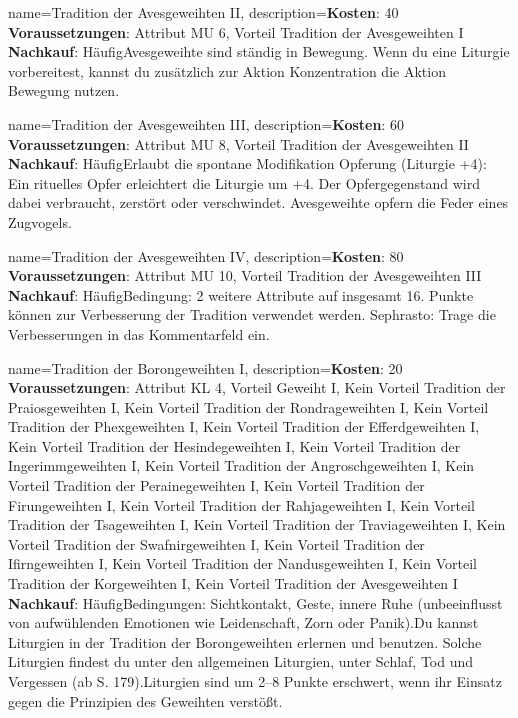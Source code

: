 {
    name={Tradition der Avesgeweihten II},
    description={\textbf{Kosten}: 40 \textbf{Voraussetzungen}: Attribut MU 6, Vorteil Tradition der Avesgeweihten I \textbf{Nachkauf}: Häufig\newline Avesgeweihte sind ständig in Bewegung. Wenn du eine Liturgie vorbereitest, kannst du zusätzlich zur Aktion Konzentration die Aktion Bewegung nutzen.}
}


{
    name={Tradition der Avesgeweihten III},
    description={\textbf{Kosten}: 60 \textbf{Voraussetzungen}: Attribut MU 8, Vorteil Tradition der Avesgeweihten II \textbf{Nachkauf}: Häufig\newline Erlaubt die spontane Modifikation Opferung (Liturgie +4): Ein rituelles Opfer erleichtert die Liturgie um +4. Der Opfergegenstand wird dabei verbraucht, zerstört oder verschwindet. Avesgeweihte opfern die Feder eines Zugvogels.}
}


{
    name={Tradition der Avesgeweihten IV},
    description={\textbf{Kosten}: 80 \textbf{Voraussetzungen}: Attribut MU 10, Vorteil Tradition der Avesgeweihten III \textbf{Nachkauf}: Häufig\newline Bedingung: 2 weitere Attribute auf insgesamt 16. Punkte können zur Verbesserung der Tradition verwendet werden. Sephrasto: Trage die Verbesserungen in das Kommentarfeld ein.}
}


{
    name={Tradition der Borongeweihten I},
    description={\textbf{Kosten}: 20 \textbf{Voraussetzungen}: Attribut KL 4, Vorteil Geweiht I, Kein Vorteil Tradition der Praiosgeweihten I, Kein Vorteil Tradition der Rondrageweihten I, Kein Vorteil Tradition der Phexgeweihten I, Kein Vorteil Tradition der Efferdgeweihten I, Kein Vorteil Tradition der Hesindegeweihten I, Kein Vorteil Tradition der Ingerimmgeweihten I, Kein Vorteil Tradition der Angroschgeweihten I, Kein Vorteil Tradition der Perainegeweihten I, Kein Vorteil Tradition der Firungeweihten I, Kein Vorteil Tradition der Rahjageweihten I, Kein Vorteil Tradition der Tsageweihten I, Kein Vorteil Tradition der Traviageweihten I, Kein Vorteil Tradition der Swafnirgeweihten I, Kein Vorteil Tradition der Ifirngeweihten I, Kein Vorteil Tradition der Nandusgeweihten I, Kein Vorteil Tradition der Korgeweihten I, Kein Vorteil Tradition der Avesgeweihten I \textbf{Nachkauf}: Häufig\newline Bedingungen: Sichtkontakt, Geste, innere Ruhe (unbeeinflusst von aufwühlenden Emotionen wie Leidenschaft, Zorn oder Panik).\newline Du kannst Liturgien in der Tradition der Borongeweihten erlernen und benutzen. Solche Liturgien findest du unter den allgemeinen Liturgien, unter Schlaf, Tod und Vergessen (ab S. 179).\newline Liturgien sind um 2–8 Punkte erschwert, wenn ihr Einsatz gegen die Prinzipien des Geweihten verstößt.}
}


